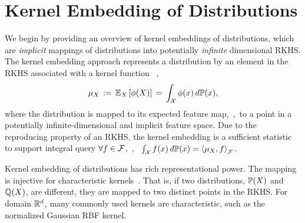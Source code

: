 \documentclass{article}
\begin{document}
%


\vspace{-3mm}
\section{Kernel Embedding of Distributions}
\label{sec:embedding}
\vspace{-2mm}

We begin by providing an overview of kernel embeddings of distributions, which are \emph{implicit} mappings of distributions into potentially \emph{infinite} dimensional RKHS.
The kernel embedding approach represents a distribution by an element in the RKHS associated with a kernel function \, \cite{SmoGreSonSch07},
\begin{align}
  \mu_{X} \, := \, \mathbb{E}_{X} \left[\phi(X)\right] \, = \, \int_{\mathcal{X}} \phi(x) \, d\mathbb{P}(x),  \label{eq:embedding}
\end{align}
where the distribution is mapped to its expected feature map,~\ie,~to a point in a potentially infinite-dimensional and implicit feature space.
Due to the reproducing property of an RKHS, the kernel embedding is a sufficient statistic to support integral query $\forall f\in\mathcal{F}$,~\ie,~
$
  \int_{\mathcal{X}} f(x)\, d\mathbb{P}(x)  = \left\langle \mu_{X},f \right\rangle_{\mathcal{F}}.
$

Kernel embedding of distributions has rich representational power. The mapping is injective for characteristic kernels~\cite{SriGreFukLanetal08}. That is, if two distributions, $\mathbb{P}(X)$ and $\mathbb{Q}(X)$, are different, they are mapped to two distinct points in the RKHS. For domain $\mathbb{R}^d$, many commonly used kernels are characteristic, such as the normalized Gaussian RBF kernel.
\end{document}
